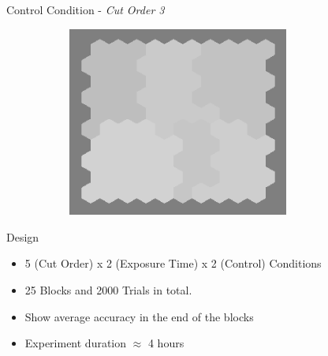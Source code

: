 \documentclass[10pt,xcolor=svgnames]{beamer} %
\begin{document}
\begin{frame}[standout]{Control Condition - \textit{Cut Order 3}}
    \begin{figure}
        \centering
        \begin{subfigure}{0.4\textwidth}
        \centering
            \includegraphics[width=0.8\textwidth]{pictures/grid_init4.png}
        \end{subfigure}
        \hfill
        \begin{subfigure}{0.4\textwidth}
            \centering 
        \end{subfigure}
    \end{figure}
\end{frame}

\begin{frame}{Design}
    \begin{itemize}
        \item 5 (Cut Order) x 2 (Exposure Time) x 2 (Control) Conditions
        \item 25 Blocks and 2000 Trials in total.
        \item Show average accuracy in the end of the blocks
        \item Experiment duration $\approx$ 4 hours
    \end{itemize}
\end{frame}
\end{document}
